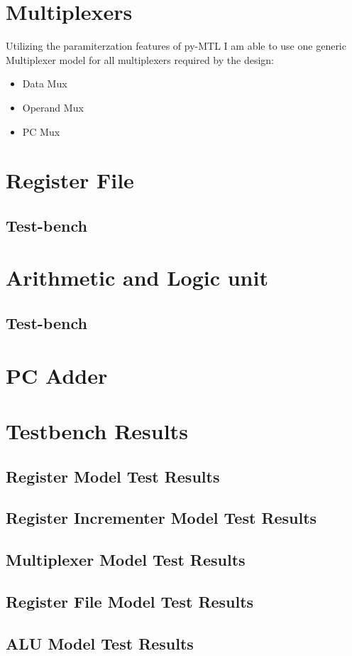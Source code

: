\documentclass{article}
\begin{document}
\section{Multiplexers}
Utilizing the paramiterzation features of py-MTL I am able to use one generic Multiplexer model for all multiplexers required by the design:
\begin{itemize}
    \item Data Mux
    \item Operand Mux
    \item PC Mux
\end{itemize}


\section{Register File}

\subsection{Test-bench}


\section{Arithmetic and Logic unit}

\subsection{Test-bench}


\section{PC Adder}

\section{Testbench Results}
\subsection{Register Model Test Results}

\subsection{Register Incrementer Model Test Results}

\subsection{Multiplexer Model Test Results}

\subsection{Register File Model Test Results}

\subsection{ALU Model Test Results}

\end{document}
